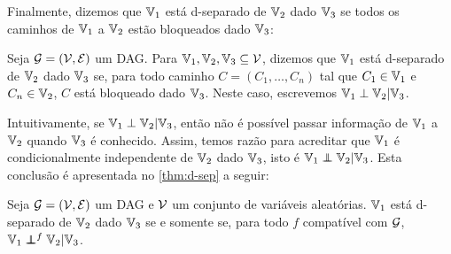 Finalmente, dizemos que ${\mathbb V}_1$ está d-separado de ${\mathbb V}_2$
dado ${\mathbb V}_3$ se todos os caminhos de 
${\mathbb V}_1$ a ${\mathbb V}_2$ estão bloqueados dado ${\mathbb V}_3$:

\begin{definition}
 \label{def:d-sep}
 Seja ${\mathcal G} = ({\mathcal V}, {\mathcal E})$ um DAG. 
 Para ${\mathbb V}_1,{\mathbb V}_2,{\mathbb V}_3 \subseteq {\mathcal V}$, dizemos que
 ${\mathbb V}_1$ está d-separado de ${\mathbb V}_2$ dado ${\mathbb V}_3$ se,
 para todo caminho $C = (C_1,\ldots,C_n)$ tal que
 $C_1 \in {\mathbb V}_1$ e $C_n \in {\mathbb V}_2$,
 $C$ está bloqueado dado ${\mathbb V}_3$.
 Neste caso, escrevemos ${\mathbb V}_1 \perp {\mathbb V}_2 | {\mathbb V}_3$.
\end{definition}

Intuitivamente, se ${\mathbb V}_1 \perp {\mathbb V}_2 | {\mathbb V}_3$, então 
não é possível passar informação de ${\mathbb V}_1$ a ${\mathbb V}_2$ quando
${\mathbb V}_3$ é conhecido.
Assim, temos razão para acreditar que
${\mathbb V}_1$ é condicionalmente independente de ${\mathbb V}_2$ dado ${\mathbb V}_3$,
isto é ${\mathbb V}_1 \perp\!\!\!\!\perp {\mathbb V}_2 | {\mathbb V}_3$.
Esta conclusão é apresentada no 
\cref{thm:d-sep} a seguir:

\begin{theorem}
 \label{thm:d-sep}
 Seja ${\mathcal G} = ({\mathcal V}, {\mathcal E})$ um DAG e
 ${\mathcal V}$ um conjunto de variáveis aleatórias.
 ${\mathbb V}_1$ está d-separado de ${\mathbb V}_2$ dado ${\mathbb V}_3$
 se e somente se, para todo $f$ compatível com ${\mathcal G}$,
 ${\mathbb V}_1 \perp\!\!\!\!\perp^f {\mathbb V}_2 | {\mathbb V}_3$.
\end{theorem}

